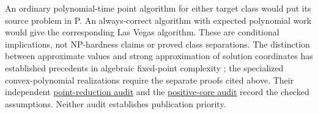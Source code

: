 An ordinary polynomial-time point algorithm for either target class
would put its source problem in P. An always-correct algorithm with
expected polynomial work would give the corresponding Las Vegas
algorithm. These are conditional implications, not NP-hardness claims
or proved class separations. The distinction between approximate
values and strong approximation of solution coordinates has established
precedents in algebraic fixed-point complexity \citep{EY2010}; the
specialized convex-polynomial realizations require the separate proofs
cited above. Their independent
\href{../reviews/point-core/hardness-audit.md}{point-reduction audit}
and the
\href{../reviews/point-core/review.md}{positive-core audit}
record the checked assumptions. Neither audit establishes publication
priority.
